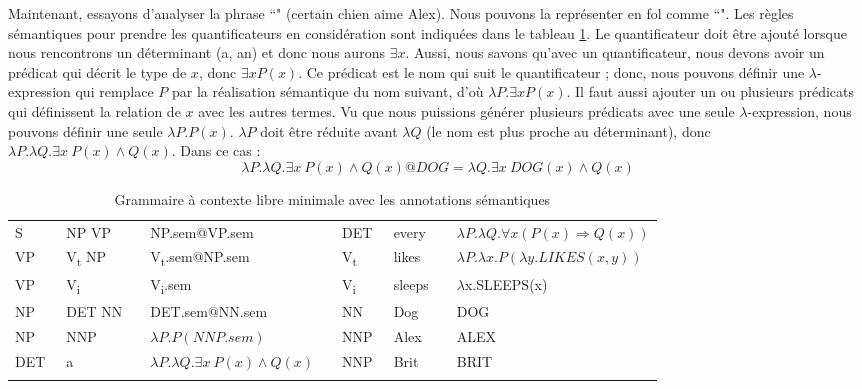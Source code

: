 \documentclass{KodeBook}
\begin{document}
Maintenant, essayons d'analyser la phrase ``" (certain chien aime Alex).
Nous pouvons la représenter en \ac{fol} comme ``".
Les règles sémantiques pour prendre les quantificateurs en considération sont indiquées dans le tableau \ref{tab:regles-sem2}. 
Le quantificateur doit être ajouté lorsque nous rencontrons un déterminant (a, an) et donc nous aurons $\exists x$. 
Aussi, nous savons qu'avec un quantificateur, nous devons avoir un prédicat qui décrit le type de $x$, donc $\exists x P(x)$.
Ce prédicat est le nom qui suit le quantificateur ; donc, nous pouvons définir une $\lambda $-expression qui remplace $P$ par la réalisation sémantique du nom suivant, d'où $\lambda P.\exists x P(x)$.
Il faut aussi ajouter un ou plusieurs prédicats qui définissent la relation de $x$ avec les autres termes. 
Vu que nous puissions générer plusieurs prédicats avec une seule $\lambda $-expression, nous pouvons définir une seule $\lambda P.P(x)$.
$\lambda P$ doit être réduite avant $\lambda Q$ (le nom est plus proche au déterminant), donc $\lambda P.\lambda Q.\exists x\ P(x) \wedge Q(x)$. 
Dans ce cas : 
\[\lambda P.\lambda Q.\exists x\ P(x) \wedge Q(x) @DOG = \lambda Q.\exists x\ DOG(x) \wedge Q(x)\]

\begin{table}[ht]
	\centering
	\begin{tabular}{lllllllll}
		\cline{1-4}\cline{6-9}\noalign{\vskip\doublerulesep
			\vskip-\arrayrulewidth}\cline{1-4}\cline{6-9}
		S  & \textrightarrow\ NP VP && NP.sem@VP.sem &&
		DET & \textrightarrow\ every && $\lambda P.\lambda Q.\forall x (P(x) \Rightarrow Q(x))$ \\
		
		VP & \textrightarrow\ V\textsubscript{t} NP && V\textsubscript{t}.sem@NP.sem &&
		V\textsubscript{t}  & \textrightarrow\ likes && $\lambda P.\lambda x.P(\lambda y.LIKES(x, y))$ \\
		
		VP & \textrightarrow\ V\textsubscript{i} && V\textsubscript{i}.sem &&
		V\textsubscript{i}  & \textrightarrow\ sleeps && $ \lambda $x.SLEEPS(x) \\
		
		NP & \textrightarrow\ DET NN && DET.sem@NN.sem  &&
		NN  & \textrightarrow\  Dog && DOG \\
		
		NP & \textrightarrow\ NNP && $\lambda P.P(NNP.sem)$  &&
		NNP  & \textrightarrow\  Alex && ALEX \\
		
		DET & \textrightarrow\ a && $\lambda P.\lambda Q.\exists x\ P(x) \wedge Q(x)$  &&
		NNP  & \textrightarrow\  Brit && BRIT \\
		\cline{1-4}\cline{6-9}\noalign{\vskip\doublerulesep
			\vskip-\arrayrulewidth}\cline{1-4}\cline{6-9}
	\end{tabular}
	\caption{Grammaire à contexte libre minimale avec les annotations sémantiques}
	\label{tab:regles-sem2}
\end{table}
\end{document}
